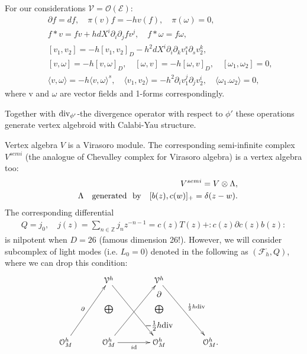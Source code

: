 \documentclass[9pt]{beamer}
\newcommand{\p}{\partial}
\begin{document}
\begin{frame}[t]

For our considerations $\mathcal{V}=\mathcal{O}(\mathcal{E})$:
\begin{eqnarray*}
&&\p f=df,\quad \pi(v)f=-hv(f), \quad\pi(\omega)=0,\nonumber\\
&&f*v=fv+hdX^i\p_i\p_jfv^j, \quad f*\omega=f\omega,\nonumber\\
&&[v_1,v_2]=-h[v_1,v_2]_D-h^2dX^i\p_i\p_kv^s_1\p_sv^k_2,\nonumber\\
&&[v,\omega]=-h[v,\omega]_D, \quad 
[\omega, v]=-h[\omega,v]_D, \quad [\omega_1,\omega_2]=0,\nonumber\\  
&&\langle v, \omega\rangle=-h\langle v, \omega\rangle^s, \quad \langle v_1, v_2\rangle=-h^2\p_iv_1^j\p_jv_2^i,\quad \langle\omega_1. \omega_2\rangle=0,
\end{eqnarray*}
where v and $\omega$ are vector fields and 1-forms correspondingly. \\

\vspace*{2mm}

Together with ${\rm div}_{\phi'}$-the divergence operator with respect to $\phi'$ these operations generate vertex algebroid with Calabi-Yau structure.

\end{frame}

\begin{frame}

Vertex algebra $V$ is a Virasoro module. The corresponding semi-infinite complex $V^{semi}$ (the analogue of Chevalley complex for Virasoro algebra) is a vertex algebra too: 
\begin{eqnarray*}
&&V^{semi}=V\otimes \Lambda, \\
&&\Lambda\quad {\rm generated~\ by} \quad [b(z), c(w)]_+=\delta(z-w).
\end{eqnarray*}
The corresponding differential  
\begin{eqnarray*}
Q=j_0, \quad j(z)=\sum_{n\in\mathbb{Z}}j_nz^{-n-1}= c(z)T(z) + :c(z)\p c(z)b(z): 
\end{eqnarray*}
is nilpotent when $D=26$ (famous dimension 26!).  
However, we will consider subcomplex of light modes  (i.e. $L_0=0$) denoted in the following as $(\mathcal{F}_h^{\cdot}, Q)$, where we can drop this condition:
\begin{eqnarray*}
\xymatrixcolsep{30pt}
\xymatrixrowsep{3pt}
\xymatrix{
& \mathcal{V}^h\ar[ddddr] & \mathcal{V}^h\ar[ddddr]^{\frac{1}{2}h{\rm div}}& \\
&& \p &&\\
& \bigoplus & \bigoplus & \\
&& {-\frac{1}{2}h{\rm div}} &&\\
\mathcal{O}_M^{h}\ar[uuuur]^{\p} & \mathcal{O}_M^{h}\ar[uuuur]\ar[r]_{i\rm{d}} & \mathcal{O}_M^{h}  & \mathcal{O}_M^{h}.
}
\end{eqnarray*}



\end{frame}
\end{document}
